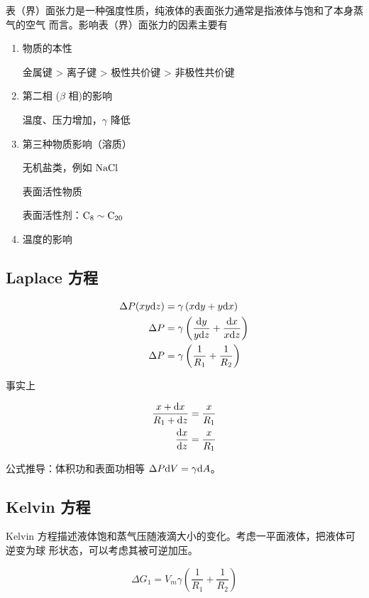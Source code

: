 表（界）面张力是一种强度性质，纯液体的表面张力通常是指液体与饱和了本身蒸气的空气
而言。影响表（界）面张力的因素主要有

\begin{enumerate}
    \item 物质的本性 \par
          金属键 > 离子键 > 极性共价键 > 非极性共价键
    \item 第二相 ($\beta$ 相)的影响 \par
          温度、压力增加，$\gamma$ 降低
    \item 第三种物质影响（溶质）\par
          无机盐类，例如 $\ce{NaCl}$ \par
          表面活性物质 \par
          表面活性剂：$\ce{C8} \sim \ce{C_{20}}$
    \item 温度的影响
\end{enumerate}


\subsection{Laplace 方程}


\begin{align}
    \Delta P (xy \mathrm{d} z) & = \gamma \left(x \mathrm{d} y + y \mathrm{d} x\right)                           \\
    \Delta P           & = \gamma \left(\frac{\mathrm{d} y}{y \mathrm{d} z} + \frac{\mathrm{d} x}{x \mathrm{d} z}\right) \\
    \Delta P           & = \gamma \left(\frac{1}{R_1} + \frac{1}{R_2}\right)
\end{align}

事实上

\begin{align}
    \frac{x + \mathrm{d} x}{R_1 + \mathrm{d} z} & = \frac{x}{R_1} \\
    \frac{\mathrm{d} x}{\mathrm{d} z}           & = \frac{x}{R_1}
\end{align}

公式推导：体积功和表面功相等 $\Delta P \mathrm{d} V = \gamma \mathrm{d} A$。


\subsection{Kelvin 方程}

Kelvin 方程描述液体饱和蒸气压随液滴大小的变化。考虑一平面液体，把液体可逆变为球
形状态，可以考虑其被可逆加压。

\begin{equation}
    \Delta G_1 = V_m \gamma \left(\frac{1}{R_1} + \frac{1}{R_2}\right)
\end{equation}

